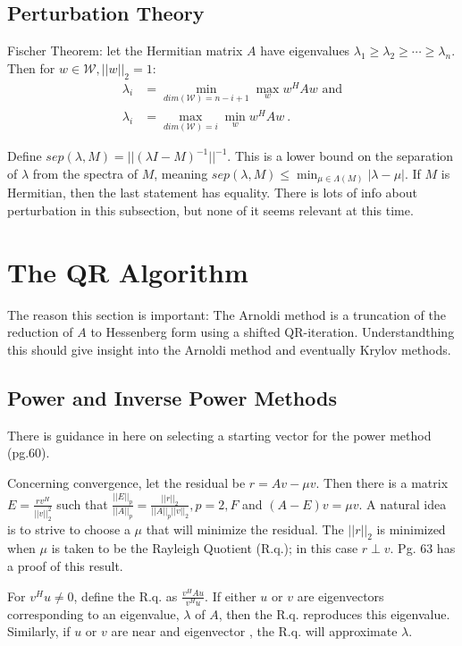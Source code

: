 \documentclass[12pt,twoside]{article}
\newcommand{\evall}{eigenvalue}
\newcommand{\evals}{eigenvalues }
\newcommand{\evec}{eigenvector }
\newcommand{\evecs}{eigenvectors }
\begin{document}
\subsection{Perturbation Theory}
Fischer Theorem: let the Hermitian matrix $A$ have \evals $\lambda_1 \ge \lambda_2 \ge \cdots \ge \lambda_n$. Then for $w \in \mathcal{W}, ||w||_2=1$:
%
\begin{align}
  \lambda_i &= \min_{dim(\mathcal{W})=n-i+1} \max_{w} w^H A w \text{  and} \\
  \lambda_i &= \max_{dim(\mathcal{W})=i} \min_{w} w^H A w \:.
\end{align}

Define $sep(\lambda, M) = ||(\lambda I - M)^{-1}||^{-1}$. This is a lower bound on the separation of $\lambda$ from the spectra of $M$, meaning $sep(\lambda, M) \le \min_{\mu \in \Lambda(M)} |\lambda - \mu|$. If $M$ is Hermitian, then the last statement has equality. There is lots of info about perturbation in this subsection, but none of it seems relevant at this time. 

\section{The QR Algorithm}
The reason this section is important: The Arnoldi method is a truncation of the reduction of $A$ to Hessenberg form using a shifted QR-iteration. Understandthing this should give insight into the Arnoldi method and eventually Krylov methods. 

\subsection{Power and Inverse Power Methods}
There is guidance in here on selecting a starting vector for the power method (pg.60). 

Concerning convergence, let the residual be $r = Av - \mu v$. Then there is a matrix $E = \frac{rv^H}{||v||_2^2}$ such that $\frac{||E||_p}{||A||_p} = \frac{||r||_2}{||A||_p||v||_2}, p = 2,F$ and $(A-E)v = \mu v$. A natural idea is to strive to choose a $\mu$ that will minimize the residual. The $||r||_2$ is minimized when $\mu$ is taken to be the Rayleigh Quotient (R.q.); in this case $r \perp v$. Pg. 63 has a proof of this result. 

For $v^H u \ne 0$, define the R.q. as $\frac{v^H Au}{v^H u}$. If either $u$ or $v$ are \evecs corresponding to an \evall, $\lambda$ of $A$, then the R.q. reproduces this \evall. Similarly, if $u$ or $v$ are near and \evec, the R.q. will approximate $\lambda$. 
\end{document}
